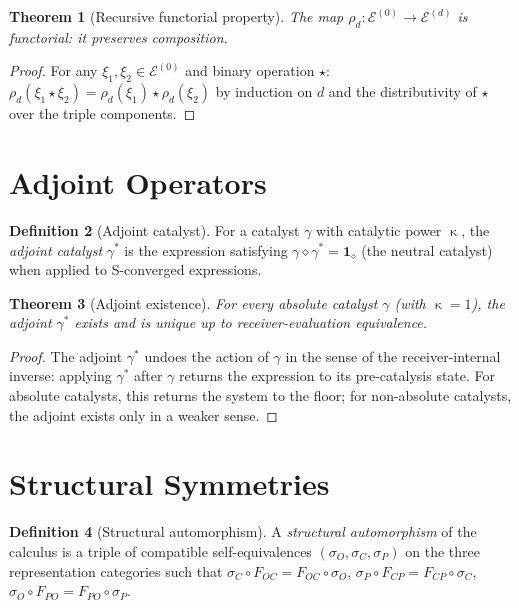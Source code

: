 \documentclass[11pt,a4paper]{article}
\theoremstyle{thmstyle}
\newtheorem{theorem}{Theorem}[section]
\theoremstyle{thmstyle}
\theoremstyle{definition}
\newtheorem{definition}[theorem]{Definition}
\theoremstyle{remark}
\DeclareMathOperator{\catpow}{\kappa}
\newcommand{\Expr}{\mathcal{E}}
\begin{document}
\begin{theorem}[Recursive functorial property]
\label{thm:rec-functorial}
The map $\rho_{d}: \Expr^{(0)} \to \Expr^{(d)}$ is
functorial: it preserves composition.
\end{theorem}

\begin{proof}
For any $\xi_{1}, \xi_{2} \in \Expr^{(0)}$ and
binary operation $\star$:
$\rho_{d}(\xi_{1} \star \xi_{2}) =
\rho_{d}(\xi_{1}) \star \rho_{d}(\xi_{2})$
by induction on $d$ and the distributivity of
$\star$ over the triple components.
\end{proof}

\section{Adjoint Operators}
\label{sec:adjoint-ops}

\begin{definition}[Adjoint catalyst]
\label{def:adj-cat}
For a catalyst $\gamma$ with catalytic power
$\catpow$, the \emph{adjoint catalyst}
$\gamma^{*}$ is the expression satisfying
$\gamma \diamond \gamma^{*} = \mathbf{1}_{\diamond}$
(the neutral catalyst) when applied to
S-converged expressions.
\end{definition}

\begin{theorem}[Adjoint existence]
\label{thm:adj-exist}
For every absolute catalyst $\gamma$ (with
$\catpow = 1$), the adjoint $\gamma^{*}$ exists
and is unique up to receiver-evaluation
equivalence.
\end{theorem}

\begin{proof}
The adjoint $\gamma^{*}$ undoes the action of
$\gamma$ in the sense of the receiver-internal
inverse: applying $\gamma^{*}$ after $\gamma$
returns the expression to its pre-catalysis state.
For absolute catalysts, this returns the system to
the floor; for non-absolute catalysts, the
adjoint exists only in a weaker sense.
\end{proof}

\section{Structural Symmetries}
\label{sec:structural-symmetries}

\begin{definition}[Structural automorphism]
\label{def:struct-auto}
A \emph{structural automorphism} of the calculus
is a triple of compatible self-equivalences
$(\sigma_{O}, \sigma_{C}, \sigma_{P})$ on the
three representation categories such that
$\sigma_{C} \circ F_{OC} = F_{OC} \circ \sigma_{O}$,
$\sigma_{P} \circ F_{CP} = F_{CP} \circ \sigma_{C}$,
$\sigma_{O} \circ F_{PO} = F_{PO} \circ \sigma_{P}$.
\end{definition}
\end{document}
